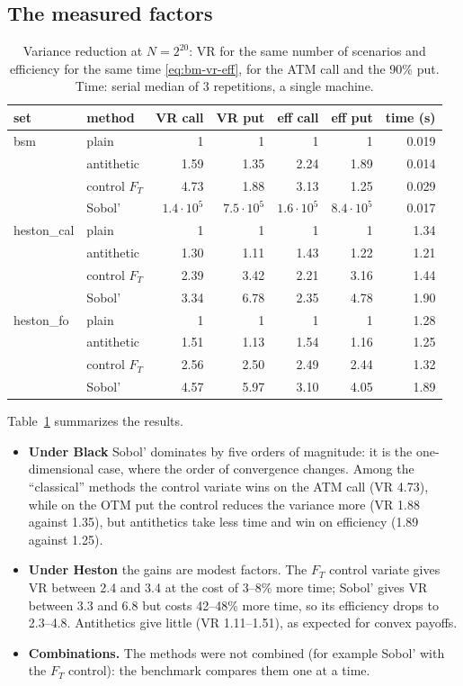 \subsection{The measured factors}
\begin{table}[ht]
\centering
\small
\caption{Variance reduction at $N=2^{20}$: VR for the same number of scenarios and efficiency for the same time
\eqref{eq:bm-vr-eff}, for the ATM call and the 90\% put. Time: serial median of 3 repetitions, a single machine.}
\label{tab:bm-vr}
\begin{tabular}{llrrrrr}
\toprule
set & method & VR call & VR put & eff call & eff put & time (s)\\
\midrule
bsm & plain & 1 & 1 & 1 & 1 & 0.019\\
& antithetic & 1.59 & 1.35 & 2.24 & 1.89 & 0.014\\
& control $F_T$ & 4.73 & 1.88 & 3.13 & 1.25 & 0.029\\
& Sobol' & $1.4\cdot10^5$ & $7.5\cdot10^5$ & $1.6\cdot10^5$ & $8.4\cdot10^5$ & 0.017\\
\midrule
heston\_cal & plain & 1 & 1 & 1 & 1 & 1.34\\
& antithetic & 1.30 & 1.11 & 1.43 & 1.22 & 1.21\\
& control $F_T$ & 2.39 & 3.42 & 2.21 & 3.16 & 1.44\\
& Sobol' & 3.34 & 6.78 & 2.35 & 4.78 & 1.90\\
\midrule
heston\_fo & plain & 1 & 1 & 1 & 1 & 1.28\\
& antithetic & 1.51 & 1.13 & 1.54 & 1.16 & 1.25\\
& control $F_T$ & 2.56 & 2.50 & 2.49 & 2.44 & 1.32\\
& Sobol' & 4.57 & 5.97 & 3.10 & 4.05 & 1.89\\
\bottomrule
\end{tabular}
\end{table}

Table~\ref{tab:bm-vr} summarizes the results.
\begin{itemize}
\item \textbf{Under Black} Sobol' dominates by five orders of magnitude: it is the one-dimensional case, where the
order of convergence changes. Among the ``classical'' methods the control variate wins on the ATM call (VR 4.73),
while on the OTM put the control reduces the variance more (VR 1.88 against 1.35), but antithetics take less time and
win on efficiency (1.89 against 1.25).
\item \textbf{Under Heston} the gains are modest factors. The $F_T$ control variate gives VR between 2.4 and 3.4 at the
cost of 3--8\% more time; Sobol' gives VR between 3.3 and 6.8 but costs 42--48\% more time, so its efficiency drops to
2.3--4.8. Antithetics give little (VR 1.11--1.51), as expected for convex payoffs.
\item \textbf{Combinations.} The methods were not combined (for example Sobol' with the $F_T$ control): the benchmark
compares them one at a time.
\end{itemize}

